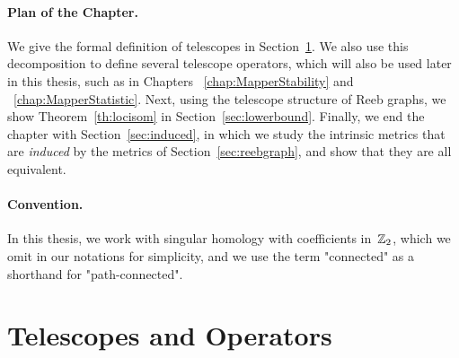 \paragraph*{Plan of the Chapter.} We give the formal definition of telescopes in Section~\ref{sec:telescope}.
We also use this decomposition to define several telescope operators, %
which will also be used later in this thesis, such as in Chapters
~\ref{chap:MapperStability} and
~\ref{chap:MapperStatistic}.
Next, using the telescope structure of Reeb graphs, we show Theorem~\ref{th:locisom} in Section~\ref{sec:lowerbound}. 
Finally, we end the chapter with Section~\ref{sec:induced}, in which we study the intrinsic metrics that are {\em induced}
by the metrics of Section~\ref{sec:reebgraph}, and show that they are all equivalent. 
 

\paragraph*{Convention.} In this thesis, we work with singular homology with coefficients in~$\mathbb{Z}_2$, which we omit in our notations for simplicity, and we use
the term "connected" as a shorthand for "path-connected".


\section{Telescopes and Operators}
\label{sec:telescope}

